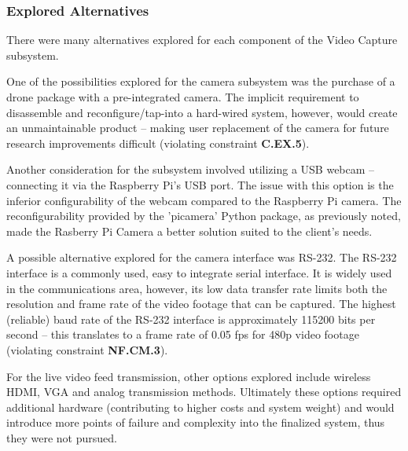 \subsubsection{Explored Alternatives}
There were many alternatives explored for each component of the Video Capture subsystem.

One of the possibilities explored for the camera subsystem was the purchase of a drone package with a pre-integrated camera. The implicit requirement to disassemble and reconfigure/tap-into a hard-wired system, however, would create an unmaintainable product -- making user replacement of the camera for future research improvements difficult (violating constraint \textbf{C.EX.5}).

Another consideration for the subsystem involved utilizing a USB webcam -- connecting it via the Raspberry Pi's USB port. The issue with this option is the inferior configurability of the webcam compared to the Raspberry Pi camera. The reconfigurability provided by the 'picamera' Python package, as previously noted, made the Rasberry Pi Camera a better solution suited to the client's needs.

A possible alternative explored for the camera interface was RS-232. The RS-232 interface is a commonly used, easy to integrate serial interface. It is widely used in the communications area, however, its low data transfer rate limits both the resolution and frame rate of the video footage that can be captured. The highest (reliable) baud rate of the RS-232 interface is approximately 115200 bits per second -- this translates to a frame rate of 0.05 fps for 480p video footage (violating constraint \textbf{NF.CM.3}).

For the live video feed transmission, other options explored include wireless HDMI, VGA and analog transmission methods.  Ultimately these options required additional hardware (contributing to higher costs and system weight) and would introduce more points of failure and complexity into the finalized system, thus they were not pursued.
